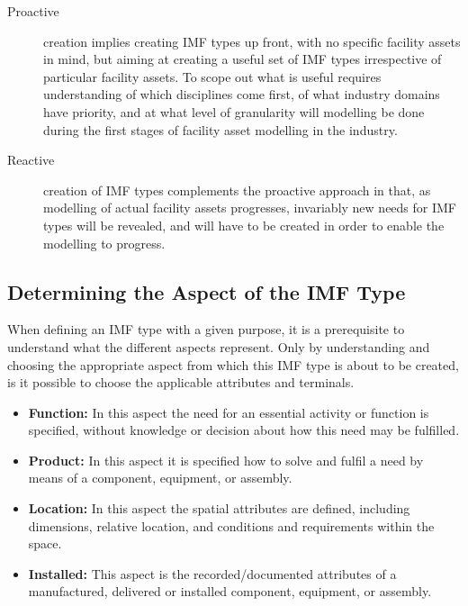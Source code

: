 \documentclass[../main.tex]{subfiles}
\begin{document}
\begin{description}
\item[Proactive] creation implies creating IMF types up front, with no specific facility assets in mind, but aiming at creating a useful set of IMF types irrespective of particular facility assets. To scope out what is useful requires understanding of which disciplines come first, of what industry domains have priority, and at what level of granularity will modelling be done during the first stages of facility asset modelling in the industry.
\item[Reactive] creation of IMF types complements the proactive approach in that, as modelling of actual facility
assets progresses, invariably new needs for IMF types will be revealed, and will have to be created in order to enable the modelling to progress.

\end{description}

\subsection{Determining the Aspect of the IMF Type}
When defining an IMF type with a given purpose, it is a prerequisite to understand what the different aspects represent. Only by understanding and choosing the appropriate aspect from which
this IMF type is about to be created, is it possible to choose the applicable attributes and terminals.
\begin{itemize}
  \item \textbf{Function:} In this aspect the need for an essential activity or function is specified, without
        knowledge or decision about how this need may be fulfilled.
  \item \textbf{Product:} In this aspect it is specified how to solve and fulfil a need by means of a component,
        equipment, or assembly.
  \item \textbf{Location:} In this aspect the spatial attributes are defined, including dimensions, relative
        location, and conditions and requirements within the space.
  \item \textbf{Installed:} This aspect is the recorded/documented attributes of a manufactured, delivered or
        installed component, equipment, or assembly.
\end{itemize}
\end{document}
